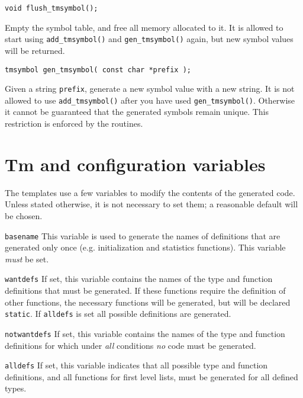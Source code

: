 \begin{verbatim}
void flush_tmsymbol();
\end{verbatim}
\begin{desc}
Empty the symbol table, and free all memory allocated to it.
It is allowed to start using \verb+add_tmsymbol()+
and \verb+gen_tmsymbol()+ again,
but new symbol values will be returned.
\end{desc}
\begin{verbatim}
tmsymbol gen_tmsymbol( const char *prefix );
\end{verbatim}
\begin{desc}
Given a string \texttt{prefix}, generate a new symbol value with a new string.
It is not allowed to use \verb+add_tmsymbol()+ after you have used
\verb+gen_tmsymbol()+.
Otherwise it cannot be guaranteed that the generated symbols remain unique.
This restriction is enforced by the routines.
\end{desc}
\section{Tm and {\C} configuration variables}
\label{s.config}
The templates use a few {\Tm} variables to modify the contents
of the generated code.
Unless stated otherwise,
it is not necessary to set them;
a reasonable default will be chosen.
\par
\begin{desctab}
\item[\texttt{basename}]
This variable is used to generate the names of
definitions that are generated only once
(e.g. initialization and statistics functions).
This variable \emph{must} be set.

\item[\texttt{wantdefs}]
If set, this variable contains the names of the type and function
definitions that must be generated.  If these functions require the
definition of other functions, the necessary functions will be
generated, but will be declared \texttt{static}.  If \texttt{alldefs}
is set all possible definitions are generated.

\item[\texttt{notwantdefs}]
If set, this variable contains the names of the type and function
definitions for which under \emph{all} conditions \emph{no} code must
be generated.

\item[\texttt{alldefs}]
If set, this variable indicates that all possible type and function
definitions, and all functions for first level lists, must be
generated for all defined types.
\end{desctab}


